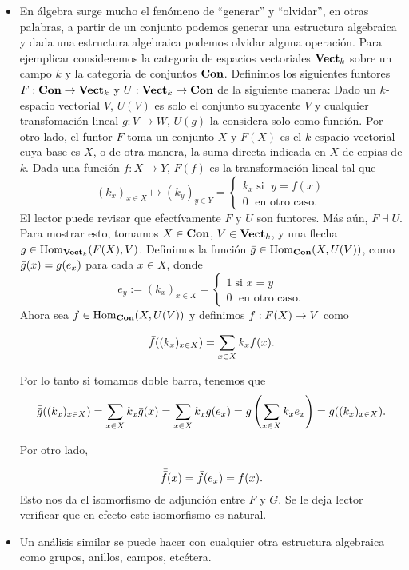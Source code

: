 \documentclass{comunicaciones}
\begin{document}
\begin{ej}
	\begin{itemize}
		\item En álgebra surge mucho el fen\'omeno de ``generar'' y ``olvidar'', en otras palabras, a partir de un conjunto podemos generar una estructura algebraica y dada una estructura algebraica podemos olvidar alguna operaci\'on. Para ejemplicar consideremos la categoria de espacios vectoriales $\mathbf{Vect}_k$ sobre un campo $k$ y la categoria de conjuntos $\mathbf{Con}$. Definimos los siguientes funtores $F:\mathbf{Con}\to\mathbf{Vect}_k$ y $U:\mathbf{Vect}_k\to\mathbf{Con}$ de la siguiente manera:
		Dado un $k$-espacio vectorial $V$, $U(V)$ es solo el conjunto subyacente $V$ y cualquier transfomaci\'on lineal $g:V\to W$, $U(g)$ la considera solo como funci\'on. Por otro lado, el funtor $F$ toma un conjunto $X$ y $F(X)$ es el $k$ espacio vectorial cuya base es $X$, o de otra manera, la suma directa indicada en $X$ de copias de $k$. Dada una funci\'on $f:X\to Y$, $F(f)$ es la transformaci\'on lineal tal que 
		\[(k_x)_{x\in X}\mapsto (k_y)_{y\in Y}=\begin{cases}
			k_x \; \text{si }\; y=f(x) \\
			0 \;\text{ en otro caso.}
		\end{cases}\]
		El lector puede revisar que efect\'ivamente $F$ y $U$ son funtores. M\'as a\'un, $F\dashv U$. Para mostrar esto, tomamos $X\in\mathbf{Con}$, $V\in\mathbf{Vect}_k$, y una flecha $g\in\mathrm{Hom}_{\mathbf{Vect}_k}(F(X),V)$. Definimos la funci\'on $\Bar{g}\in\mathrm{Hom}_{\mathbf{Con}}(X,U(V))$, como $\Bar{g}(x)=g(e_x)$ para cada $x\in X$, donde 
		\[e_y:=(k_x)_{x\in X}=\begin{cases}
			1 \;\text{si } x=y \\
			0 \;\text{ en otro caso.} 
		\end{cases}\]
		Ahora sea $f\in\mathrm{Hom}_{\mathbf{Con}}(X,U(V))$ y definimos $\Bar{f}:F(X)\to V$ como 
		
		\[\Bar{f}((k_x)_{x\in X})=\sum_{x\in X} k_xf(x).\]
		
		Por lo tanto si tomamos doble barra, tenemos que 
		\[\Bar{\Bar{g}}((k_x)_{x\in X})=\sum_{x\in X} k_x\Bar{g}(x)=\sum_{x\in X} k_xg(e_x)=g\left(\sum_{x\in X}k_xe_x\right)=g((k_x)_{x\in X}).\]
		
		Por otro lado,
		
		\[\Bar{\Bar{f}}(x)=\Bar{f}(e_x)=f(x).\]
		Esto nos da el isomorfismo de adjunci\'on entre $F$ y $G$. Se le deja lector verificar que en efecto este isomorfismo es natural.
		
		
		\item Un an\'alisis similar se puede hacer con cualquier otra estructura algebraica como grupos, anillos, campos, etc\'etera.
		

\end{itemize}
\end{ej}
\end{document}
